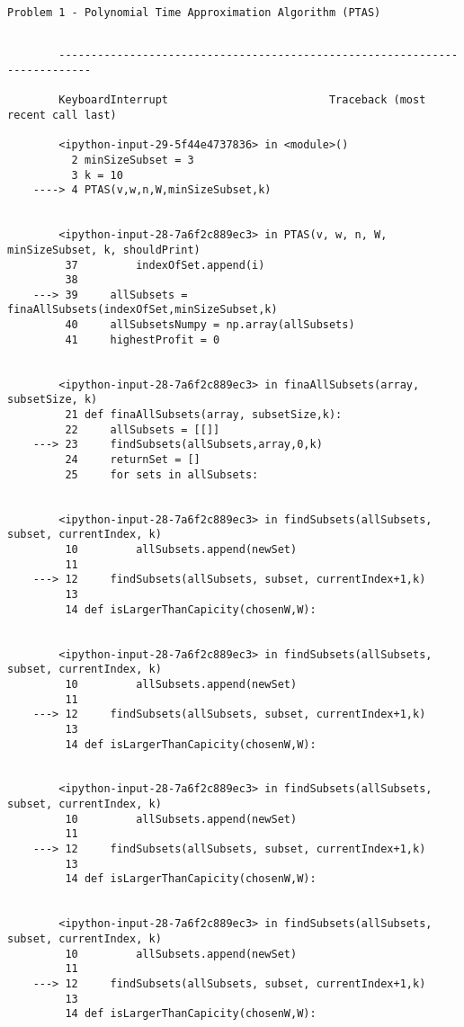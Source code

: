 \documentclass[11pt]{article}
\begin{document}
    \begin{Verbatim}[commandchars=\\\{\}]
Problem 1 - Polynomial Time Approximation Algorithm (PTAS) 

    \end{Verbatim}

    \begin{Verbatim}[commandchars=\\\{\}]

        ---------------------------------------------------------------------------

        KeyboardInterrupt                         Traceback (most recent call last)

        <ipython-input-29-5f44e4737836> in <module>()
          2 minSizeSubset = 3
          3 k = 10
    ----> 4 PTAS(v,w,n,W,minSizeSubset,k)
    

        <ipython-input-28-7a6f2c889ec3> in PTAS(v, w, n, W, minSizeSubset, k, shouldPrint)
         37         indexOfSet.append(i)
         38 
    ---> 39     allSubsets = finaAllSubsets(indexOfSet,minSizeSubset,k)
         40     allSubsetsNumpy = np.array(allSubsets)
         41     highestProfit = 0


        <ipython-input-28-7a6f2c889ec3> in finaAllSubsets(array, subsetSize, k)
         21 def finaAllSubsets(array, subsetSize,k):
         22     allSubsets = [[]]
    ---> 23     findSubsets(allSubsets,array,0,k)
         24     returnSet = []
         25     for sets in allSubsets:


        <ipython-input-28-7a6f2c889ec3> in findSubsets(allSubsets, subset, currentIndex, k)
         10         allSubsets.append(newSet)
         11 
    ---> 12     findSubsets(allSubsets, subset, currentIndex+1,k)
         13 
         14 def isLargerThanCapicity(chosenW,W):


        <ipython-input-28-7a6f2c889ec3> in findSubsets(allSubsets, subset, currentIndex, k)
         10         allSubsets.append(newSet)
         11 
    ---> 12     findSubsets(allSubsets, subset, currentIndex+1,k)
         13 
         14 def isLargerThanCapicity(chosenW,W):


        <ipython-input-28-7a6f2c889ec3> in findSubsets(allSubsets, subset, currentIndex, k)
         10         allSubsets.append(newSet)
         11 
    ---> 12     findSubsets(allSubsets, subset, currentIndex+1,k)
         13 
         14 def isLargerThanCapicity(chosenW,W):


        <ipython-input-28-7a6f2c889ec3> in findSubsets(allSubsets, subset, currentIndex, k)
         10         allSubsets.append(newSet)
         11 
    ---> 12     findSubsets(allSubsets, subset, currentIndex+1,k)
         13 
         14 def isLargerThanCapicity(chosenW,W):



\end{Verbatim}
\end{document}
